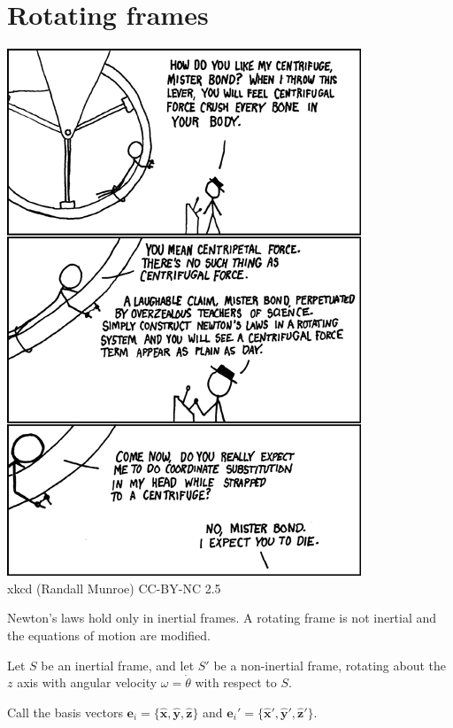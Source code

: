 \documentclass[a4paper]{article}
\begin{document}
\section{Rotating frames}
\begin{center}
  \includegraphics[scale=0.75]{images/xkcd_centrifugal_force.png}\\
  xkcd (Randall Munroe) CC-BY-NC 2.5
\end{center}
Newton's laws hold only in inertial frames. A rotating frame is not inertial and the equations of motion are modified.

Let $S$ be an inertial frame, and let $S'$ be a non-inertial frame, rotating about the $z$ axis with angular velocity $\omega = \dot{\theta}$ with respect to $S$.

Call the basis vectors $\mathbf{e}_i = \{\hat{\mathbf{x}}, \hat{\mathbf{y}}, \hat{\mathbf{z}}\}$ and $\mathbf{e}_i' = \{\hat{\mathbf{x}}', \hat{\mathbf{y}}', \hat{\mathbf{z}}'\}$.
\end{document}
